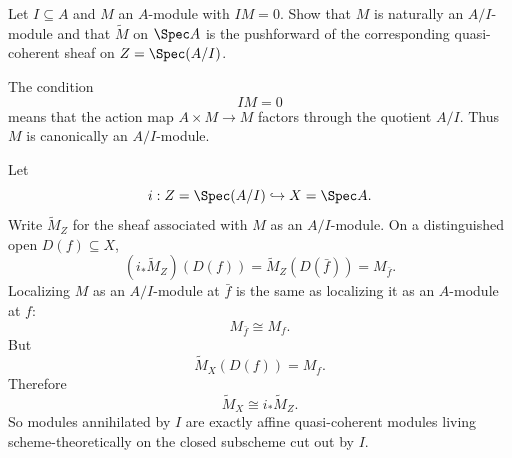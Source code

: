 \begin{problem}\label{prob:vi33-17}
Let \(I\subseteq A\) and \(M\) an \(A\)-module with \(IM=0\). Show that \(M\) is naturally an \(A/I\)-module and
that \(\widetilde M\) on \(\Spec A\) is the pushforward of the corresponding quasi-coherent sheaf on
\(Z=\Spec(A/I)\).

\end{problem}

\ifdefined\FullProblemDossiers
\begin{solution}
The condition
\[
IM=0
\]
means that the action map \(A\times M\to M\) factors through the quotient \(A/I\). Thus \(M\) is canonically an
\(A/I\)-module.

Let
\[
i:Z=\Spec(A/I)\hookrightarrow X=\Spec A.
\]
Write \(\widetilde M_Z\) for the sheaf associated with \(M\) as an \(A/I\)-module.  On a distinguished open
\(D(f)\subseteq X\),
\[
(i_*\widetilde M_Z)(D(f))
=
\widetilde M_Z(D(\bar f))
=
M_{\bar f}.
\]
Localizing \(M\) as an \(A/I\)-module at \(\bar f\) is the same as localizing it as an \(A\)-module at \(f\):
\[
M_{\bar f}\cong M_f.
\]
But
\[
\widetilde M_X(D(f))=M_f.
\]
Therefore
\[
\boxed{
\widetilde M_X\cong i_*\widetilde M_Z.
}
\]
So modules annihilated by \(I\) are exactly affine quasi-coherent modules living scheme-theoretically on the
closed subscheme cut out by \(I\).
\end{solution}
\fi
